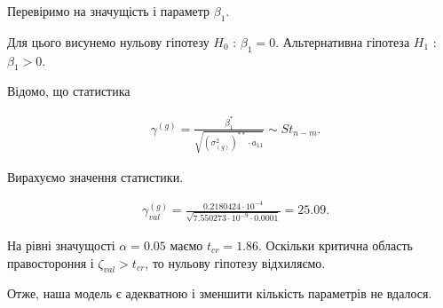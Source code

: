 \documentclass[14pt,a4paper]{scrartcl}
\theoremstyle{definition}
\theoremstyle{remark}
\theoremstyle{definition}
\theoremstyle{definition}
\begin{document}
Перевіримо на значущість і параметр $\beta_{1}$.

Для цього висунемо нульову гіпотезу $H_{0}$ : $\beta_{1} = 0$. Альтернативна гіпотеза $H_{1}$ : $\beta_{1} > 0$.

Відомо, що статистика

\begin{align*}
  & \gamma^{(g)} = \frac{\beta_{1}^{*}}{\sqrt{(\sigma_{(g)}^2)^{**}\cdot a_{11}}} \sim St_{n - m}.
\end{align*}

Вирахуємо значення статистики.

\begin{align*}
  & \gamma^{(g)}_{val} = \frac{0.2180424 \cdot 10^{-4}}{\sqrt{7.550273 \cdot 10^{-9} \cdot 0.0001}} = 25.09.
\end{align*}

На рівні значущості $\alpha = 0.05$ маємо $t_{cr} = 1.86$. Оскільки критична область правостороння і $\zeta_{val} > t_{cr}$, то нульову гіпотезу відхиляємо.

Отже, наша модель є адекватною і зменшити кількість параметрів не вдалося.
\end{document}
